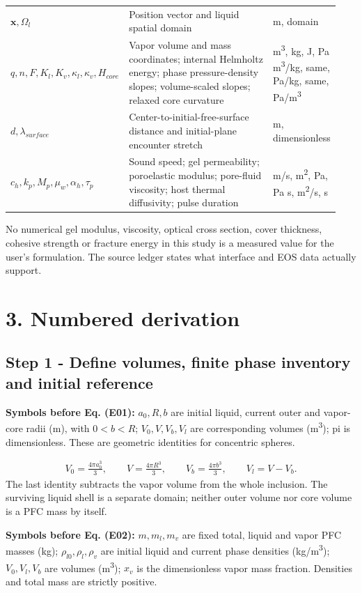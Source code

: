 \documentclass[10pt,a4paper]{article}
\begin{document}
\begin{longtable}{>{\raggedright\arraybackslash}p{0.31\linewidth}>{\raggedright\arraybackslash}p{0.45\linewidth}>{\raggedright\arraybackslash}p{0.18\linewidth}}
$\mathbf x,\Omega_l$ & Position vector and liquid spatial domain & m, domain\\[4pt]
$q,n,F,K_l,K_v,\kappa_l,\kappa_v,H_{core}$ & Vapor volume and mass coordinates; internal Helmholtz energy; phase pressure-density slopes; volume-scaled slopes; relaxed core curvature & m\textsuperscript{3}, kg, J, Pa m\textsuperscript{3}/kg, same, Pa/kg, same, Pa/m\textsuperscript{3}\\[4pt]
$d,\lambda_{surface}$ & Center-to-initial-free-surface distance and initial-plane encounter stretch & m, dimensionless\\[4pt]
$c_h,k_p,M_p,\mu_w,\alpha_h,\tau_p$ & Sound speed; gel permeability; poroelastic modulus; pore-fluid viscosity; host thermal diffusivity; pulse duration & m/s, m\textsuperscript{2}, Pa, Pa s, m\textsuperscript{2}/s, s\\[4pt]
\bottomrule\end{longtable}
No numerical gel modulus, viscosity, optical cross section, cover thickness, cohesive strength or fracture energy in this study is a measured value for the user's formulation. The source ledger states what interface and EOS data actually support.

\section*{3. Numbered derivation}
\subsection*{Step 1  -  Define volumes, finite phase inventory and initial reference}
\textbf{Symbols before Eq. (E01):} $a_0,R,b$ are initial liquid, current outer and vapor-core radii (m), with $0<b<R$; $V_0,V,V_b,V_l$ are corresponding volumes (m\textsuperscript{3}); pi is dimensionless. These are geometric identities for concentric spheres.

{\small\begin{align*}
V_0=\frac{4\pi a_0^3}{3},\qquad
V=\frac{4\pi R^3}{3},\qquad
V_b=\frac{4\pi b^3}{3},\qquad V_l=V-V_b. \tag{E01}
\end{align*}}
The last identity subtracts the vapor volume from the whole inclusion. The surviving liquid shell is a separate domain; neither outer volume nor core volume is a PFC mass by itself.

\textbf{Symbols before Eq. (E02):} $m,m_l,m_v$ are fixed total, liquid and vapor PFC masses (kg); $\rho_{l0},\rho_l,\rho_v$ are initial liquid and current phase densities (kg/m\textsuperscript{3}); $V_0,V_l,V_b$ are volumes (m\textsuperscript{3}); $x_v$ is the dimensionless vapor mass fraction. Densities and total mass are strictly positive.
\end{document}
